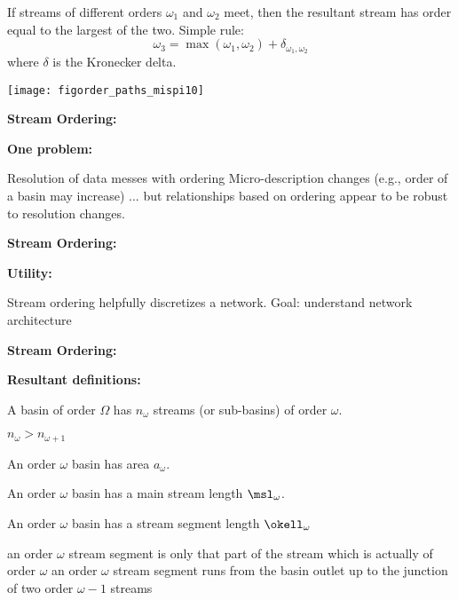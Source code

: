 \begin{frame}[label=]
\begin{frame}[label=]
\begin{frame}[label=]
\begin{frame}[label=]
\begin{frame}[label=]
\begin{frame}[label=]
\begin{frame}[label=]
\begin{frame}[label=]
\begin{frame}[label=]
\begin{frame}[label=]
\begin{frame}[label=]
\begin{frame}[label=]
\begin{frame}[label=]
\begin{frame}[label=]
\begin{columns}[b]
\begin{frame}[label=]
\begin{frame}[label=]
          
      
       If streams of different orders $\omega_1$ and $\omega_2$ meet,
        then the resultant stream has order equal to the largest of the two.
       Simple rule:
        $$
        \omega_3 = \max(\omega_1,\omega_2) + \delta_{\omega_1,\omega_2}
        $$
       {\small where $\delta$ is the Kronecker delta.}
      
      
      \texttt{[image: figorder\_paths\_mispi10]}  
    
%    
    
  


\begin{frame}[label=]
  \textbf{Stream Ordering:}  

  \textbf{One problem:}
    
     Resolution of data messes with ordering
     Micro-description changes (e.g., order of a basin may increase) 
     ... but relationships based on ordering appear to be robust to resolution changes.
    
  
  

\begin{frame}[label=]
  \textbf{Stream Ordering:}

  \textbf{Utility:}
    
     Stream ordering helpfully discretizes a network.
     Goal: understand \alert{network architecture}
    
  


\begin{frame}[label=]
  \textbf{Stream Ordering:}


  \textbf{Resultant definitions:}
    
     
      A basin of order $\Omega$ has 
      \alert{$n_\omega$} streams (or sub-basins) of order $\omega$.
      
       $n_\omega > n_{\omega+1}$
      
     
      An order $\omega$ basin has \alert{area $a_\omega$}.
     
      An order $\omega$ basin has a \alert{main stream length $\msl_\omega$}.
      
      An order $\omega$ basin has a \alert{stream segment length $\okell_\omega$}
      
       an order $\omega$ stream segment is only that part of the stream which is actually of order $\omega$
       an order $\omega$ stream segment runs from the 
        basin outlet up to the junction of two order $\omega-1$ streams
      

\end{frame}
\end{frame}
\end{frame}
\end{frame}
\end{frame}
\end{columns}
\end{frame}
\end{frame}
\end{frame}
\end{frame}
\end{frame}
\end{frame}
\end{frame}
\end{frame}
\end{frame}
\end{frame}
\end{frame}
\end{frame}
\end{frame}
\end{frame}
